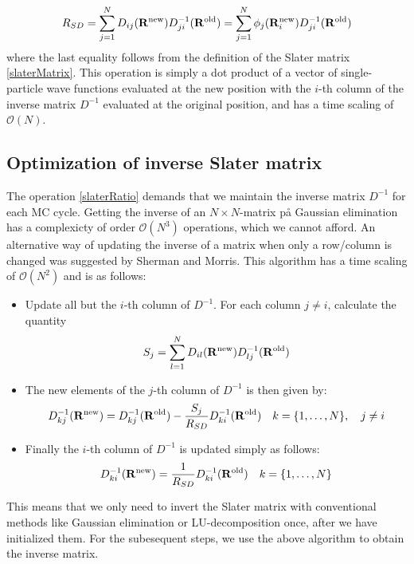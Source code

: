 \documentclass[english, a4paper]{article}
\begin{document}
\begin{equation}
 R_{SD} = \sum_{j=1}^N D_{ij}({\bf R}^{\textrm{new}}) D_{ji}^{-1}({\bf R}^{\textrm{old}})
        = \sum_{j=1}^N \phi_j({\bf R}_i^{\textrm{new}}) D_{ji}^{-1}({\bf R}^{\textrm{old}})
        \label{slaterRatio}
\end{equation}
where the last equality follows from the definition of the Slater matrix \eqref{slaterMatrix}. 
This operation is simply a dot product of a vector of single-particle wave functions evaluated
at the new position with the $i$-th column of the inverse matrix $D^{-1}$ evaluated at the original position,
and has a time scaling of $\mathcal{O}(N)$.\\

\noindent 

\subsection{Optimization of inverse Slater matrix}
\noindent The operation \eqref{slaterRatio} demands that we maintain the inverse matrix $D^{-1}$ for each
MC cycle. Getting the inverse of an $N\times N$-matrix på Gaussian elimination has a complexicty of order
$\mathcal{O}(N^3)$ operations, which we cannot afford. An alternative way of updating the inverse
of a matrix when only a row/column is changed was suggested by Sherman and Morris. 
This algorithm has a time scaling
of $\mathcal{O}(N^2)$ and is as follows:
\begin{itemize}
 \item Update all but the $i$-th column of $D^{-1}$. For each column $j\neq i$,
 calculate the quantity 
 $$S_j = \sum_{l=1}^N D_{il} ({\bf R}^{\textrm{new}}) D_{lj}^{-1} ({\bf R}^{\textrm{old}})$$
 \item The new elements of the $j$-th column of $D^{-1}$ is then given by: 
 $$D_{kj}^{-1}({\bf R}^{\textrm{new}}) = D_{kj}^{-1}({\bf R}^{\textrm{old}}) - \frac{S_j}{R_{SD}}
 D_{ki}^{-1}({\bf R}^{\textrm{old}}) \quad k = \{1,\dots,N\}, \quad j \neq i$$
 \item Finally the $i$-th column of $D^{-1}$ is updated simply as follows:
 $$D_{ki}^{-1}({\bf R}^{\textrm{new}}) = \frac{1}{R_{SD}} D_{ki}^{-1}({\bf R}^{\textrm{old}}) \quad
 k = \{1,\dots,N\}$$
\end{itemize}
This means that we only need to invert the Slater matrix with conventional methods like
Gaussian elimination or LU-decomposition once, after we have initialized them. For the subesequent steps,
we use the above algorithm to obtain the inverse matrix. 
\end{document}
